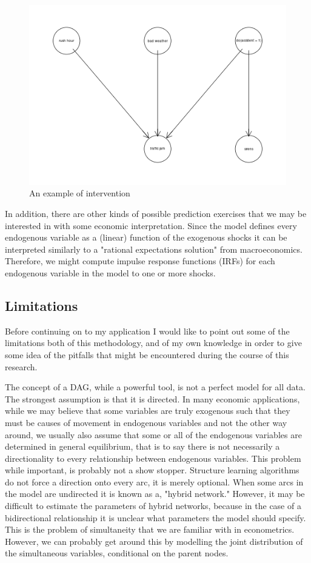 \documentclass{article}
\begin{document}
\begin{figure}
\centering
\label{dag3}
\includegraphics[width=\textwidth]{images/trafficjam_intervention.png}
\caption{An example of intervention}
\end{figure}

In addition, there are other kinds of possible prediction exercises that we may be interested in with some economic interpretation. Since the model defines every endogenous variable as a (linear) function of the exogenous shocks it can be interpreted similarly to a "rational expectations solution" from macroeconomics. Therefore, we might compute impulse response functions (IRFs) for each endogenous variable in the model to one or more shocks.

\subsection{Limitations}

Before continuing on to my application I would like to point out some of the limitations both of this methodology, and of my own knowledge in order to give some idea of the pitfalls that might be encountered during the course of this research. 

The concept of a DAG, while a powerful tool, is not a perfect model for all data. The strongest assumption is that it is directed. In many economic applications, while we may believe that some variables are truly exogenous such that they must be causes of movement in endogenous variables and not the other way around, we usually also assume that some or all of the endogenous variables are determined in general equilibrium, that is to say there is not necessarily a directionality to every relationship between endogenous variables. This problem while important, is probably not a show stopper. Structure learning algorithms do not force a direction onto every arc, it is merely optional. When some arcs in the model are undirected it is known as a, "hybrid network." However, it may be difficult to estimate the parameters of hybrid networks, because in the case of a bidirectional relationship it is unclear what parameters the model should specify. This is the problem of simultaneity that we are familiar with in econometrics. However, we can probably get around this by modelling the joint distribution of the simultaneous variables, conditional on the parent nodes.
\end{document}
